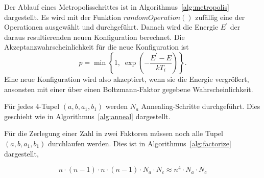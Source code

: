 Der Ablauf eines Metropolisschrittes ist in Algorithmus~\ref{alg:metropolis} dargestellt. Es wird mit der Funktion $\mathrm{\textit{randomOperation}}\left(\right)$ zufällig eine der Operationen ausgewählt und durchgeführt. Danach wird die Energie $E^\prime$ der daraus resultierenden neuen Konfiguration berechnet. Die Akzeptanzwahrscheinlichkeit für die neue Konfiguration ist
\begin{equation*}
		p=\min\left\{1,\;\exp\left(-\frac{E^\prime-E}{k T_i}\right)\right\}.
\end{equation*}
Eine neue Konfiguration wird also akzeptiert, wenn sie die Energie vergrößert, ansonsten mit einer über einen Boltzmann-Faktor gegebene Wahrscheinlichkeit. \\

\FloatBarrier{}

Für jedes $4$-Tupel $\left(a,b,a_1,b_1\right)$ werden $N_a$ Annealing-Schritte durchgeführt. Dies geschieht wie in Algorithmus~\ref{alg:anneal} dargestellt.

\FloatBarrier{}

Für die Zerlegung einer Zahl in zwei Faktoren müssen noch alle Tupel $\left(a,b,a_1,b_1\right)$ durchlaufen werden. Dies ist in Algorithmus~\ref{alg:factorize} dargestellt,

\FloatBarrier{}
\begin{equation*}
		n\cdot\left(n-1\right)\cdot n\cdot\left(n-1\right)\cdot N_a\cdot N_c\approx n^4\cdot N_a\cdot N_c
\end{equation*}
